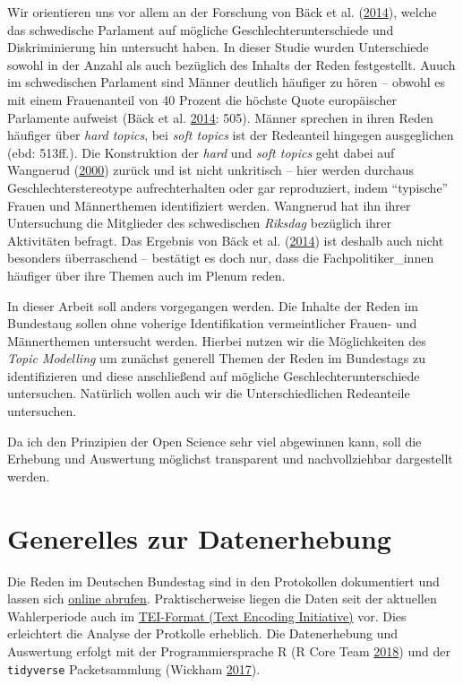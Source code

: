 \documentclass[oneside, 12pt, numbers=endperiod]{scrbook}
\theoremstyle{definition}
\theoremstyle{definition}
\theoremstyle{definition}
\theoremstyle{remark}
\begin{document}
Wir orientieren uns vor allem an der Forschung von Bäck et al.
(\protect\hyperlink{ref-back_2014}{2014}), welche das schwedische
Parlament auf mögliche Geschlechterunterschiede und Diskriminierung hin
untersucht haben. In dieser Studie wurden Unterschiede sowohl in der
Anzahl als auch bezüglich des Inhalts der Reden festgestellt. Auuch im
schwedischen Parlament sind Männer deutlich häufiger zu hören -- obwohl
es mit einem Frauenanteil von 40 Prozent die höchste Quote europäischer
Parlamente aufweist (Bäck et al.
\protect\hyperlink{ref-back_2014}{2014}: 505). Männer sprechen in ihren
Reden häufiger über \emph{hard topics}, bei \emph{soft topics} ist der
Redeanteil hingegen ausgeglichen (ebd: 513ff.). Die Konstruktion der
\emph{hard} und \emph{soft topics} geht dabei auf Wangnerud
(\protect\hyperlink{ref-wangnerud_2000}{2000}) zurück und ist nicht
unkritisch -- hier werden durchaus Geschlechterstereotype
aufrechterhalten oder gar reproduziert, indem ``typische'' Frauen und
Männerthemen identifiziert werden. Wangnerud hat ihn ihrer Untersuchung
die Mitglieder des schwedischen \emph{Riksdag} bezüglich ihrer
Aktivitäten befragt. Das Ergebnis von Bäck et al.
(\protect\hyperlink{ref-back_2014}{2014}) ist deshalb auch nicht
besonders überraschend -- bestätigt es doch nur, dass die
Fachpolitiker\_innen häufiger über ihre Themen auch im Plenum reden.

In dieser Arbeit soll anders vorgegangen werden. Die Inhalte der Reden
im Bundestaug sollen ohne voherige Identifikation vermeintlicher Frauen-
und Männerthemen untersucht werden. Hierbei nutzen wir die Möglichkeiten
des \emph{Topic Modelling} um zunächst generell Themen der Reden im
Bundestags zu identifizieren und diese anschließend auf mögliche
Geschlechterunterschiede untersuchen. Natürlich wollen auch wir die
Unterschiedlichen Redeanteile untersuchen.

Da ich den Prinzipien der Open Science sehr viel abgewinnen kann, soll
die Erhebung und Auswertung möglichst transparent und nachvollziehbar
dargestellt werden.

\hypertarget{data-01}{%
\chapter{Generelles zur Datenerhebung}\label{data-01}}

Die Reden im Deutschen Bundestag sind in den Protokollen dokumentiert
und lassen sich \href{https://www.bundestag.de/protokolle}{online
abrufen}. Praktischerweise liegen die Daten seit der aktuellen
Wahlerperiode auch im \href{http://www.tei-c.org/}{TEI-Format (Text
Encoding Initiative)} vor. Dies erleichtert die Analyse der Protkolle
erheblich. Die Datenerhebung und Auswertung erfolgt mit der
Programmiersprache R (R Core Team
\protect\hyperlink{ref-rcoreteam_2018}{2018}) und der \texttt{tidyverse}
Packetsammlung (Wickham \protect\hyperlink{ref-wickham_2017}{2017}).
\end{document}
